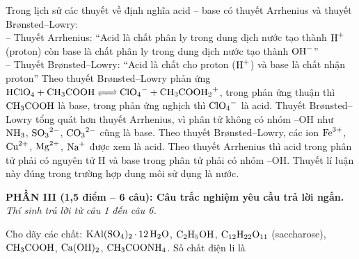 \documentclass[12pt,a4paper]{article}
\begin{document}
\begin{ex}
Trong lịch sử các thuyết về định nghĩa acid -- base có thuyết Arrhenius và thuyết Brønsted--Lowry:\\
-- Thuyết Arrhenius: ``Acid là chất phân ly trong dung dịch nước tạo thành $\ce{H+}$ (proton) còn base là chất phân ly trong dung dịch nước tạo thành $\ce{OH-}$''\\
-- Thuyết Brønsted--Lowry: ``Acid là chất cho proton ($\ce{H+}$) và base là chất nhận proton''
\choiceTF
{Theo thuyết Brønsted--Lowry phản ứng $\ce{HClO4 + CH3COOH <=> ClO4- + CH3COOH2+}$, trong phản ứng thuận thì $\ce{CH3COOH}$ là base, trong phản ứng nghịch thì $\ce{ClO4-}$ là acid.}
{\True Thuyết Brønsted--Lowry tổng quát hơn thuyết Arrhenius, vì phân tử không có nhóm --OH như $\ce{NH3}$, $\ce{SO3^2-}$, $\ce{CO3^2-}$ cũng là base.}
{Theo thuyết Brønsted--Lowry, các ion $\ce{Fe^3+}$, $\ce{Cu^2+}$, $\ce{Mg^2+}$, $\ce{Na+}$ được xem là acid.}
{\True Theo thuyết Arrhenius thì acid trong phân tử phải có nguyên tử H và base trong phân tử phải có nhóm --OH. Thuyết lí luận này đúng trong trường hợp dung môi sử dụng là nước.}
\end{ex}

\bigskip
\noindent
\textbf{PHẦN III (1,5 điểm -- 6 câu): Câu trắc nghiệm yêu cầu trả lời ngắn.}\\
\textit{Thí sinh trả lời từ câu 1 đến câu 6.}

\begin{ex}
Cho dãy các chất: $\ce{KAl(SO4)2.12H2O}$, $\ce{C2H5OH}$, $\ce{C12H22O11}$ (saccharose), $\ce{CH3COOH}$, $\ce{Ca(OH)2}$, $\ce{CH3COONH4}$. Số chất điện li là

\end{ex}
\end{document}
